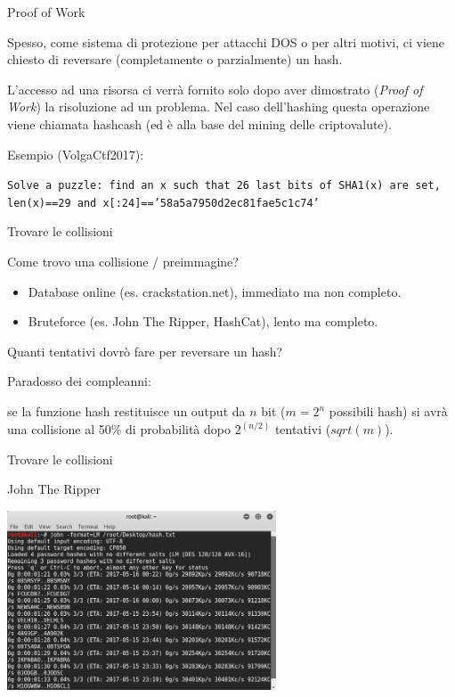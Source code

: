 \documentclass[handout, xcolor=dvipsnames,aspectratio=169]{beamer}
\begin{document}
\begin{frame}{Proof of Work}
    \pause

    Spesso, come sistema di protezione per attacchi DOS o per altri motivi, ci viene chiesto di reversare (completamente o parzialmente) un hash.
    
    \pause \medskip
        
    L'accesso ad una risorsa ci verrà fornito solo dopo aver dimostrato (\textit{Proof of Work}) la risoluzione ad un problema.
    Nel caso dell'hashing questa operazione viene chiamata hashcash (ed è alla base del mining delle criptovalute).
    
    \medskip
    
    \pause

    Esempio (VolgaCtf2017):
    
    \texttt{Solve a puzzle: find an x such that 26 last bits of SHA1(x) are set, len(x)==29 and x[:24]=='58a5a7950d2ec81fae5c1c74'}
    
\end{frame}

\begin{frame}{Trovare le collisioni}

    Come trovo una collisione / preimmagine?
    
    \pause

    \begin{itemize}
      \item Database online (es. crackstation.net), immediato ma non completo.
      \item Bruteforce (es. John The Ripper, HashCat), lento ma completo.
    \end{itemize}
    
    \medskip
    \pause
    
    Quanti tentativi dovrò fare per reversare un hash?
    
    \pause
    \medskip
    
    Paradosso dei compleanni: 
    
    se la funzione hash restituisce un output da $n$ bit ($m = 2^n$ possibili hash) si avrà una collisione al 50\% di probabilità dopo $2^{(n/2)}$ tentativi ($sqrt(m)$).
    
\end{frame}

\begin{frame}{Trovare le collisioni}

    John The Ripper
    
    \medskip
    
    \centering\includegraphics[width=8cm]{img/john}
    
\end{frame}
\end{document}
